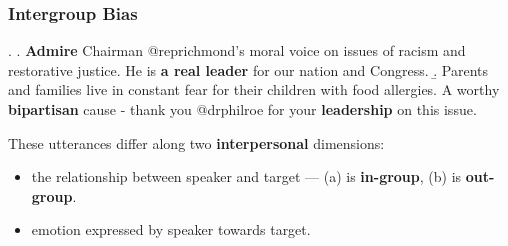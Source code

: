 \begin{frame}[c]\frametitle{Intergroup Bias}


    \ex.\label{ex:intro-1} \a. \alert{\textbf{Admire}} Chairman @reprichmond’s moral voice on issues of racism and restorative justice. He is \alert{\textbf{a real leader}} for our nation and Congress.
    \b. Parents and families live in constant fear for their children with food allergies. A worthy \alert{\textbf{bipartisan}} cause - thank you @drphilroe for your \alert{\textbf{leadership}} on this issue.

    \pause\vfill

    These utterances differ along two \textbf{interpersonal} dimensions:
    
    \begin{itemize}
        \item the relationship between speaker and target --- (a) is \textbf{in-group}, (b) is \textbf{out-group}.
        \item emotion expressed by speaker towards target.
    \end{itemize}

\end{frame}


% 
%     
% 

% 
%       

